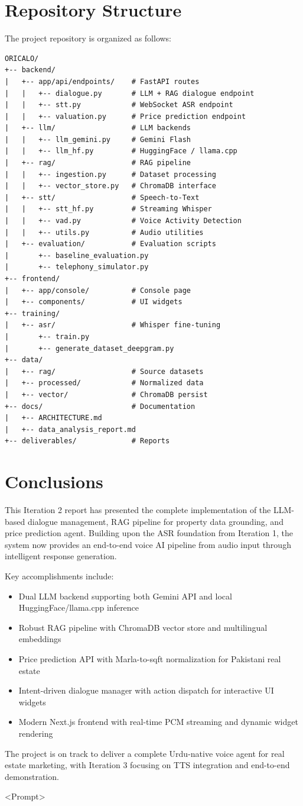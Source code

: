 \section{Repository Structure}

The project repository is organized as follows:

\begin{verbatim}
ORICALO/
+-- backend/
|   +-- app/api/endpoints/    # FastAPI routes
|   |   +-- dialogue.py       # LLM + RAG dialogue endpoint
|   |   +-- stt.py            # WebSocket ASR endpoint
|   |   +-- valuation.py      # Price prediction endpoint
|   +-- llm/                  # LLM backends
|   |   +-- llm_gemini.py     # Gemini Flash
|   |   +-- llm_hf.py         # HuggingFace / llama.cpp
|   +-- rag/                  # RAG pipeline
|   |   +-- ingestion.py      # Dataset processing
|   |   +-- vector_store.py   # ChromaDB interface
|   +-- stt/                  # Speech-to-Text
|   |   +-- stt_hf.py         # Streaming Whisper
|   |   +-- vad.py            # Voice Activity Detection
|   |   +-- utils.py          # Audio utilities
|   +-- evaluation/           # Evaluation scripts
|       +-- baseline_evaluation.py
|       +-- telephony_simulator.py
+-- frontend/
|   +-- app/console/          # Console page
|   +-- components/           # UI widgets
+-- training/
|   +-- asr/                  # Whisper fine-tuning
|       +-- train.py
|       +-- generate_dataset_deepgram.py
+-- data/
|   +-- rag/                  # Source datasets
|   +-- processed/            # Normalized data
|   +-- vector/               # ChromaDB persist
+-- docs/                     # Documentation
|   +-- ARCHITECTURE.md
|   +-- data_analysis_report.md
+-- deliverables/             # Reports
\end{verbatim}

\section{Conclusions}

This Iteration 2 report has presented the complete implementation of the LLM-based dialogue management, RAG pipeline for property data grounding, and price prediction agent. Building upon the ASR foundation from Iteration 1, the system now provides an end-to-end voice AI pipeline from audio input through intelligent response generation.

Key accomplishments include:
\begin{itemize}
    \item Dual LLM backend supporting both Gemini API and local HuggingFace/llama.cpp inference
    \item Robust RAG pipeline with ChromaDB vector store and multilingual embeddings
    \item Price prediction API with Marla-to-sqft normalization for Pakistani real estate
    \item Intent-driven dialogue manager with action dispatch for interactive UI widgets
    \item Modern Next.js frontend with real-time PCM streaming and dynamic widget rendering
\end{itemize}

The project is on track to deliver a complete Urdu-native voice agent for real estate marketing, with Iteration 3 focusing on TTS integration and end-to-end demonstration.

<Prompt>